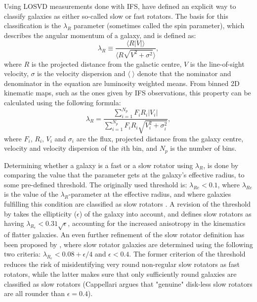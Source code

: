 \documentclass[english, twoside]{HYgradu}
\begin{document}
Using LOSVD measurements done with IFS, \cite{Emsellem2007} have defined an explicit way to classify galaxies as either so-called slow or fast rotators. The basis for this classification is the $\lambda_R$ parameter (sometimes called the spin parameter), which describes the angular momentum of a galaxy, and is defined as:  
\begin{equation}
\lambda_R \equiv \frac{\langle R |V| \rangle}{\langle R \sqrt{V^2 + \sigma^2} \rangle}, \label{eq:general_lambdar}
\end{equation}
where $R$ is the projected distance from the galactic centre, $V$ is the line-of-sight velocity, $\sigma$ is the velocity dispersion and $\langle \; \rangle$ denote that the nominator and denominator in the equation are luminosity weighted means. From binned 2D kinematic maps, such as the ones given by IFS observations, this property can be calculated using the following formula:
\begin{equation}
\lambda_R = \frac{\sum^{N_p}_{i=1} F_i R_i |V_i|}{\sum^{N_p}_{i=1} F_i R_i \sqrt{V_i^2 + \sigma^2_i}}, \label{eq:binned_lambdar}
\end{equation}
where $F_i$, $R_i$, $V_i$ and $\sigma_i$ are the flux, projected distance from the galaxy centre, velocity and velocity dispersion of the $i$th bin, and $N_p$ is the number of bins.

Determining whether a galaxy is a fast or a slow rotator using $\lambda_R$, is done by comparing the value that the parameter gets at the galaxy's effective radius, to some pre-defined threshold. The originally used threshold is: $\lambda_{Re} < 0.1$, where $\lambda_{Re}$ is the value of the $\lambda_R$-parameter at the effective radius, and where galaxies fulfilling this condition are classified as slow rotators \citep{Emsellem2007}. A revision of the threshold by \cite{Emsellem2011} takes the ellipticity ($\epsilon$) of the galaxy into account, and defines slow rotators as having $\lambda_{R_e} < 0.31 \sqrt{\epsilon}$, accounting for the increased anisotropy in the kinematics of flatter galaxies. An even further refinement of the slow rotator definition has been proposed by \cite{Cappellari2016}, where slow rotator galaxies are determined using the following two criteria: $\lambda_{R_e} < 0.08 + \epsilon/4$ and $\epsilon < 0.4$. The former criterion of the threshold reduces the risk of misidentifying very round non-regular slow rotators as fast rotators, while the latter makes sure that only sufficiently round galaxies are classified as slow rotators (Cappellari argues that "genuine" disk-less slow rotators are all rounder than $\epsilon = 0.4$).
\end{document}

